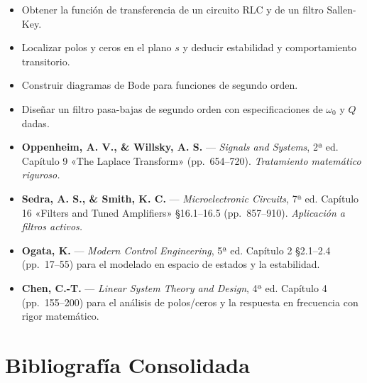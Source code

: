 \documentclass[11pt, letterpaper]{article}
\begin{document}
\begin{objetivos}
\begin{itemize}
  \item Obtener la función de transferencia de un circuito RLC y de un filtro Sallen-Key.
  \item Localizar polos y ceros en el plano $s$ y deducir estabilidad y comportamiento transitorio.
  \item Construir diagramas de Bode para funciones de segundo orden.
  \item Diseñar un filtro pasa-bajas de segundo orden con especificaciones de $\omega_0$ y $Q$ dadas.
\end{itemize}
\end{objetivos}

\begin{lecturas}
\begin{itemize}
  \item[$(\star)$] \textbf{Oppenheim, A. V., \& Willsky, A. S.} — \emph{Signals and Systems}, 2ª ed. Capítulo 9 «The Laplace Transform» (pp.\ 654--720). \textit{Tratamiento matemático riguroso.}
  \item[$(\star)$] \textbf{Sedra, A. S., \& Smith, K. C.} — \emph{Microelectronic Circuits}, 7ª ed. Capítulo 16 «Filters and Tuned Amplifiers» §16.1--16.5 (pp.\ 857--910). \textit{Aplicación a filtros activos.}
  \item \textbf{Ogata, K.} — \emph{Modern Control Engineering}, 5ª ed. Capítulo 2 §2.1--2.4 (pp.\ 17--55) para el modelado en espacio de estados y la estabilidad.
  \item \textbf{Chen, C.-T.} — \emph{Linear System Theory and Design}, 4ª ed. Capítulo 4 (pp.\ 155--200) para el análisis de polos/ceros y la respuesta en frecuencia con rigor matemático.
\end{itemize}
\end{lecturas}

\newpage

\section{Bibliografía Consolidada}
\end{document}
